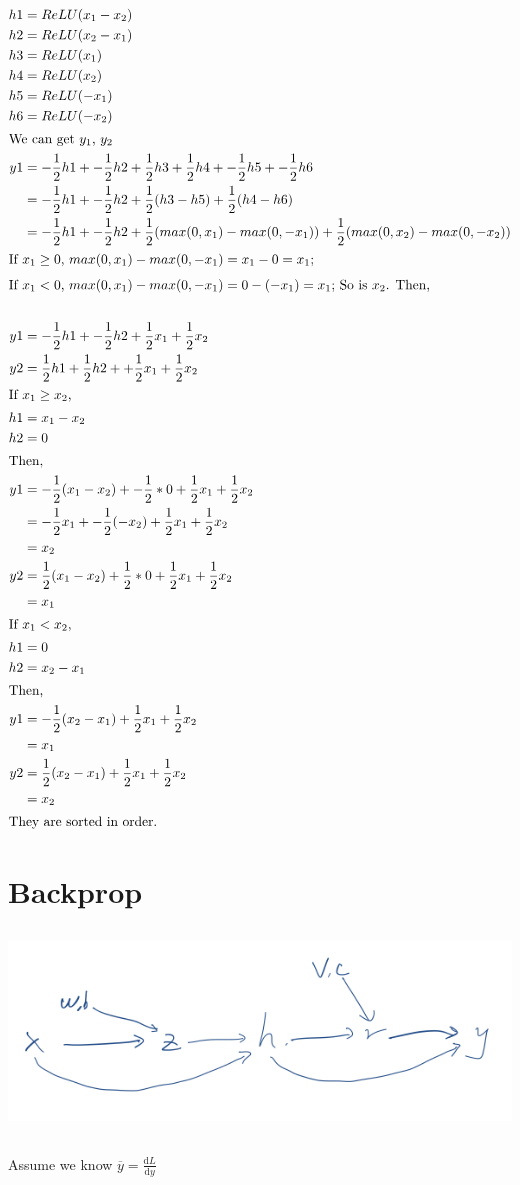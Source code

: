 \documentclass{article}
\begin{document}
\begin{align*}
h1&=ReLU(x_1-x_2)\\
h2&=ReLU(x_2-x_1)\\
h3&=ReLU(x_1)\\
h4&=ReLU(x_2)\\
h5&=ReLU(-x_1)\\
h6&=ReLU(-x_2)\\
\intertext{We can get $y_1$, $y_2$}
y1&=-\frac{1}{2}h1 + -\frac{1}{2}h2 + \frac{1}{2}h3 + \frac{1}{2}h4 + -\frac{1}{2}h5 + -\frac{1}{2}h6\\
&=-\frac{1}{2}h1 + -\frac{1}{2}h2 + \frac{1}{2}(h3-h5) + \frac{1}{2}(h4-h6)\\
&=-\frac{1}{2}h1 + -\frac{1}{2}h2 + \frac{1}{2}(max(0,x_1)-max(0,-x_1)) + \frac{1}{2}(max(0,x_2)-max(0,-x_2))\\
\intertext{If $x_1 \geq 0$, $max(0,x_1)-max(0,-x_1)=x_1-0=x_1$;}
\intertext{If $x_1 < 0$, $max(0,x_1)-max(0,-x_1)=0-(-x_1)=x_1$; So is $x_2$. Then,}\\
y1&=-\frac{1}{2}h1 + -\frac{1}{2}h2 + \frac{1}{2}x_1+\frac{1}{2}x_2\\
y2&=\frac{1}{2}h1 + \frac{1}{2}h2 + + \frac{1}{2}x_1+\frac{1}{2}x_2\\
\intertext{If $x_1 \geq x_2$,}
h1&=x_1-x_2\\
h2&=0\\
\intertext{Then,}
y1&=-\frac{1}{2}(x_1-x_2) + -\frac{1}{2}*0 + \frac{1}{2}x_1+\frac{1}{2}x_2\\
&=-\frac{1}{2}x_1+ -\frac{1}{2}(-x_2) + \frac{1}{2}x_1+\frac{1}{2}x_2\\
&=x_2\\
y2&=\frac{1}{2}(x_1-x_2) + \frac{1}{2}*0 + \frac{1}{2}x_1+\frac{1}{2}x_2\\
&=x_1\\
\intertext{If $x_1 < x_2$,}
h1&=0\\
h2&=x_2-x_1\\
\intertext{Then,}
y1&=-\frac{1}{2}(x_2-x_1) + \frac{1}{2}x_1+\frac{1}{2}x_2\\
&=x_1\\
y2&=\frac{1}{2}(x_2-x_1) + \frac{1}{2}x_1+\frac{1}{2}x_2\\
&=x_2\\
\intertext{They are sorted in order.}
\end{align*}
\section{Backprop}
\subsection{}
\includegraphics[width=\textwidth,height=\textheight,keepaspectratio]{cg.png}
\subsection{}
Assume we know $\overline{y} = \frac{\mathrm{d} L}{\mathrm{d} y} $
\end{document}
